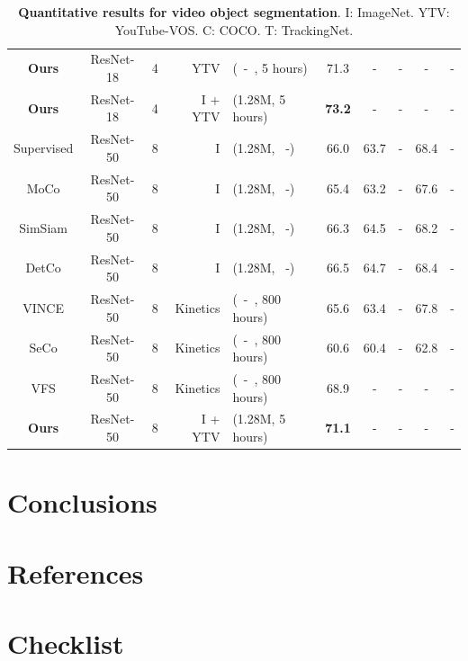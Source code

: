 \documentclass{article}
\begin{document}
\begin{table}[t]
{\begin{tabular}{cccrlccccc}
      \textbf{Ours} & ResNet-18 & 4 & YTV &(~-~, 5 hours)
			& 71.3 & - & - & - & - \\
      \textbf{Ours} & ResNet-18 & 4 & I + YTV &(1.28M, 5 hours)
			& \textbf{73.2} & - & - & - & - \\
			\hline
      \hline
      Supervised & ResNet-50 & 8 & I &(1.28M, ~-)
			& 66.0 & 63.7 & - & 68.4 & - \\
      MoCo & ResNet-50 & 8 & I &(1.28M, ~-)
			& 65.4 & 63.2 & - & 67.6 & - \\
      SimSiam & ResNet-50 & 8 & I &(1.28M, ~-)
			& 66.3 & 64.5 & - & 68.2 & - \\
      DetCo & ResNet-50 & 8 & I &(1.28M, ~-)
			& 66.5 & 64.7 & - & 68.4 & - \\
      VINCE & ResNet-50 & 8 & Kinetics &(~-~, 800 hours)
			& 65.6 & 63.4 & - & 67.8 & - \\
      SeCo & ResNet-50 & 8 & Kinetics &(~-~, 800 hours)
			& 60.6 & 60.4 & - & 62.8 & - \\
      VFS  & ResNet-50 & 8 & Kinetics &(~-~, 800 hours)
			& 68.9 & - & - & - & - \\
      \hline
      \textbf{Ours} & ResNet-50 & 8 & I + YTV &(1.28M, 5 hours)
			& \textbf{71.1} & - & - & - & - \\
			\bottomrule
		\end{tabular}
	}
	\captionsetup{font=small}
	\caption{\textbf{Quantitative results for video object segmentation}. I: ImageNet. YTV: YouTube-VOS. C: COCO. T: TrackingNet.}
	\label{table:davis}
	\vspace{-8pt}
\end{table}

\section{Conclusions}


\section*{References}
\medskip


{
\small


}


\section*{Checklist}
\end{document}
